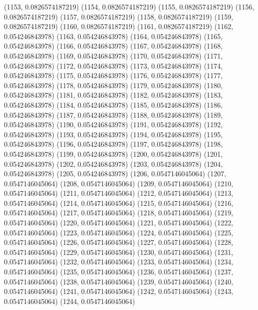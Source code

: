 {					(1153, 0.0826574187219)
					(1154, 0.0826574187219)
					(1155, 0.0826574187219)
					(1156, 0.0826574187219)
					(1157, 0.0826574187219)
					(1158, 0.0826574187219)
					(1159, 0.0826574187219)
					(1160, 0.0826574187219)
					(1161, 0.0826574187219)
					(1162, 0.054246843978)
					(1163, 0.054246843978)
					(1164, 0.054246843978)
					(1165, 0.054246843978)
					(1166, 0.054246843978)
					(1167, 0.054246843978)
					(1168, 0.054246843978)
					(1169, 0.054246843978)
					(1170, 0.054246843978)
					(1171, 0.054246843978)
					(1172, 0.054246843978)
					(1173, 0.054246843978)
					(1174, 0.054246843978)
					(1175, 0.054246843978)
					(1176, 0.054246843978)
					(1177, 0.054246843978)
					(1178, 0.054246843978)
					(1179, 0.054246843978)
					(1180, 0.054246843978)
					(1181, 0.054246843978)
					(1182, 0.054246843978)
					(1183, 0.054246843978)
					(1184, 0.054246843978)
					(1185, 0.054246843978)
					(1186, 0.054246843978)
					(1187, 0.054246843978)
					(1188, 0.054246843978)
					(1189, 0.054246843978)
					(1190, 0.054246843978)
					(1191, 0.054246843978)
					(1192, 0.054246843978)
					(1193, 0.054246843978)
					(1194, 0.054246843978)
					(1195, 0.054246843978)
					(1196, 0.054246843978)
					(1197, 0.054246843978)
					(1198, 0.054246843978)
					(1199, 0.054246843978)
					(1200, 0.054246843978)
					(1201, 0.054246843978)
					(1202, 0.054246843978)
					(1203, 0.054246843978)
					(1204, 0.054246843978)
					(1205, 0.054246843978)
					(1206, 0.0547146045064)
					(1207, 0.0547146045064)
					(1208, 0.0547146045064)
					(1209, 0.0547146045064)
					(1210, 0.0547146045064)
					(1211, 0.0547146045064)
					(1212, 0.0547146045064)
					(1213, 0.0547146045064)
					(1214, 0.0547146045064)
					(1215, 0.0547146045064)
					(1216, 0.0547146045064)
					(1217, 0.0547146045064)
					(1218, 0.0547146045064)
					(1219, 0.0547146045064)
					(1220, 0.0547146045064)
					(1221, 0.0547146045064)
					(1222, 0.0547146045064)
					(1223, 0.0547146045064)
					(1224, 0.0547146045064)
					(1225, 0.0547146045064)
					(1226, 0.0547146045064)
					(1227, 0.0547146045064)
					(1228, 0.0547146045064)
					(1229, 0.0547146045064)
					(1230, 0.0547146045064)
					(1231, 0.0547146045064)
					(1232, 0.0547146045064)
					(1233, 0.0547146045064)
					(1234, 0.0547146045064)
					(1235, 0.0547146045064)
					(1236, 0.0547146045064)
					(1237, 0.0547146045064)
					(1238, 0.0547146045064)
					(1239, 0.0547146045064)
					(1240, 0.0547146045064)
					(1241, 0.0547146045064)
					(1242, 0.0547146045064)
					(1243, 0.0547146045064)
					(1244, 0.0547146045064)
}
